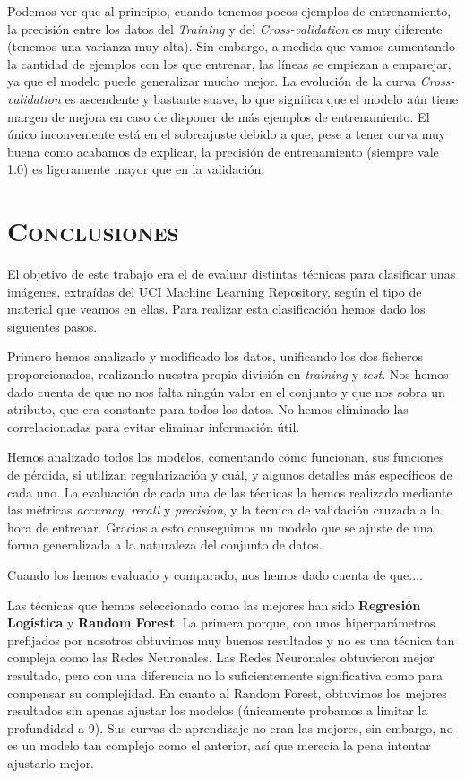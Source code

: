 \documentclass[11pt,a4paper]{article}
\begin{document}
Podemos ver que al principio, cuando tenemos pocos ejemplos de entrenamiento, la precisión entre los datos del \textit{Training} y del
\textit{Cross-validation} es muy diferente (tenemos una varianza muy alta). Sin embargo, a medida que vamos aumentando la cantidad de
ejemplos con los que entrenar, las líneas se empiezan a emparejar, ya que el modelo puede generalizar mucho mejor. La evolución de la curva
\textit{Cross-validation} es ascendente y bastante suave, lo que significa que el modelo aún tiene margen de mejora en caso de disponer de
más ejemplos de entrenamiento. El único inconveniente está en el sobreajuste debido a que, pese a tener curva muy buena como acabamos de
explicar, la precisión de entrenamiento (siempre vale 1.0) es ligeramente mayor que en la validación.

\section{\textsc{Conclusiones}}

El objetivo de este trabajo era el de evaluar distintas técnicas para clasificar unas imágenes, extraídas del UCI Machine Learning
Repository, según el tipo de material que veamos en ellas. Para realizar esta clasificación hemos dado los siguientes pasos.

Primero hemos analizado y modificado los datos, unificando los dos ficheros proporcionados, realizando nuestra propia división en
\textit{training} y \textit{test}. Nos hemos dado cuenta de que no nos falta ningún valor en el conjunto y que nos sobra un atributo, que
era constante para todos los datos. No hemos eliminado las correlacionadas para evitar eliminar información útil.

Hemos analizado todos los modelos, comentando cómo funcionan, sus funciones de pérdida, si utilizan regularización y cuál, y algunos
detalles más específicos de cada uno. La evaluación de cada una de las técnicas la hemos realizado mediante las métricas
\textit{accuracy}, \textit{recall} y \textit{precision}, y la técnica de validación cruzada a la hora de entrenar. Gracias a esto
conseguimos un modelo que se ajuste de una forma generalizada a la naturaleza del conjunto de datos.

Cuando los hemos evaluado y comparado, nos hemos dado cuenta de que....

Las técnicas que hemos seleccionado como las mejores han sido \textbf{Regresión Logística} y \textbf{Random Forest}. La primera porque,
con unos hiperparámetros prefijados por nosotros obtuvimos muy buenos resultados y no es una técnica tan compleja como las Redes
Neuronales. Las Redes Neuronales obtuvieron mejor resultado, pero con una diferencia no lo suficientemente significativa como para
compensar su complejidad. En cuanto al Random Forest, obtuvimos los mejores resultados sin apenas ajustar los modelos (únicamente probamos
a limitar la profundidad a 9). Sus curvas de aprendizaje no eran las mejores, sin embargo, no es un modelo tan complejo como el anterior,
así que merecía la pena intentar ajustarlo mejor.
\end{document}
